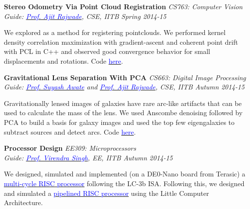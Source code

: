 \documentclass[margin,line]{res}
\newenvironment{list1}{
  \begin{list}{\ding{113}}{%
      \setlength{\itemsep}{0in}
      \setlength{\parsep}{0in} \setlength{\parskip}{0in}
      \setlength{\topsep}{0in} \setlength{\partopsep}{0in} 
      \setlength{\leftmargin}{0.17in}}}{\end{list}}
\begin{document}
\begin{resume}
\vspace*{-0.1in}

{\bf Stereo Odometry Via Point Cloud Registration} \hfill \textit{CS763: Computer Vision} \\
{\em Guide: \href{https://www.cse.iitb.ac.in/~ajitvr}{\textcolor{blue}{Prof. Ajit Rajwade}}, CSE, IITB \hfill Spring 2014-15} \\
\vspace*{-.15in}
\begin{list1}
\item[] We explored  as a method for registering pointclouds. We performed kernel density correlation maximization with gradient-ascent and coherent point drift with PCL in C++ and observed good convergence behavior for small displacements and rotations. Code \href{https://github.com/alankarkotwal/stereo-vo}{\textcolor{blue} {here}}.
\end{list1}

\vspace*{-0.1in}

{\bf Gravitational Lens Separation With PCA} \hfill \textit{CS663: Digital Image Processing} \\
{\em Guide: \href{https://www.cse.iitb.ac.in/~suyash}{\textcolor{blue}{Prof. Suyash Awate}} and \href{https://www.cse.iitb.ac.in/~ajitvr}{\textcolor{blue}{Prof. Ajit Rajwade}}, CSE, IITB \hfill Autumn 2014-15} \\
\vspace*{-.15in}
\begin{list1}
\item[] Gravitationally lensed images of galaxies have rare arc-like artifacts that can be used to calculate the mass of the lens. We used Anscombe denoising followed by PCA to build a basis for galaxy images and used the top few eigengalaxies to subtract sources and detect arcs. Code \href{https://github.com/alankarkotwal/pca-lens-finder}{\textcolor{blue} {here}}.
\end{list1}

\vspace*{-0.1in}

{\bf Processor Design} \hfill \textit{EE309: Microprocessors} \\
{\em Guide: \href{https://www.ee.iitb.ac.in/~viren/}{\textcolor{blue}{Prof. Virendra Singh}}, EE, IITB \hfill Autumn 2014-15} \\
\vspace*{-.15in}
\begin{list1}
\item[] We designed, simulated and implemented (on a DE0-Nano board from Terasic) a \href{https://github.com/alankarkotwal/lc-3b-processor}{\textcolor{blue} {multi-cycle RISC processor}} following the LC-3b ISA. Following this, we designed and simulated a \href{https://github.com/alankarkotwal/lca-processor}{\textcolor{blue} {pipelined RISC processor}} using the Little Computer Architecture.
\end{list1}


\end{resume}
\end{document}
